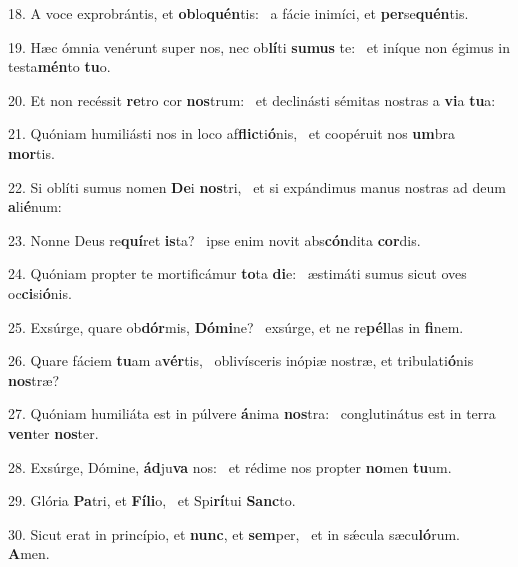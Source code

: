 18. A voce exprobrántis, et \textbf{ob}lo\textbf{quén}tis: \ast\  a fácie inimíci, et \textbf{per}se\textbf{quén}tis.\

19. Hæc ómnia venérunt super nos, nec ob\textbf{lí}ti \textbf{su}\textbf{mus} te: \ast\  et iníque non égimus in testa\textbf{mén}to \textbf{tu}o.\

20. Et non recéssit \textbf{re}tro cor \textbf{nos}trum: \ast\  et declinásti sémitas nostras a \textbf{vi}a \textbf{tu}a:\

21. Quóniam humiliásti nos in loco af\textbf{flic}ti\textbf{ó}nis, \ast\  et coopéruit nos \textbf{um}bra \textbf{mor}tis.\

22. Si oblíti sumus nomen \textbf{De}i \textbf{nos}tri, \ast\  et si expándimus manus nostras ad deum \textbf{a}li\textbf{é}num:\

23. Nonne Deus re\textbf{quí}ret \textbf{is}ta? \ast\  ipse enim novit abs\textbf{cón}dita \textbf{cor}dis.\

24. Quóniam propter te mortificámur \textbf{to}ta \textbf{di}e: \ast\  æstimáti sumus sicut oves oc\textbf{ci}si\textbf{ó}nis.\

25. Exsúrge, quare ob\textbf{dór}mis, \textbf{Dó}\textbf{mi}ne? \ast\  exsúrge, et ne re\textbf{pél}las in \textbf{fi}nem.\

26. Quare fáciem \textbf{tu}am a\textbf{vér}tis, \ast\  oblivísceris inópiæ nostræ, et tribulati\textbf{ó}nis \textbf{nos}træ?\

27. Quóniam humiliáta est in púlvere \textbf{á}nima \textbf{nos}tra: \ast\  conglutinátus est in terra \textbf{ven}ter \textbf{nos}ter.\

28. Exsúrge, Dómine, \textbf{ád}ju\textbf{va} nos: \ast\  et rédime nos propter \textbf{no}men \textbf{tu}um.\

29. Glória \textbf{Pa}tri, et \textbf{Fí}\textbf{li}o, \ast\  et Spi\textbf{rí}tui \textbf{Sanc}to.\

30. Sicut erat in princípio, et \textbf{nunc}, et \textbf{sem}per, \ast\  et in sǽcula sæcu\textbf{ló}rum. \textbf{A}men.\

